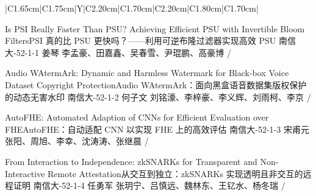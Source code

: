 \Needspace{7.5cm}
\begin{tabularx}{\textwidth}{|C{1.65cm}|C{1.75cm}|Y|C{2.20cm}|C{1.70cm}|C{2.20cm}|C{1.80cm}|C{1.70cm}|}
\HeaderRow

{Is PSI Really Faster Than PSU? Achieving Efficient PSU with Invertible Bloom Filters\newline PSI 真的比 PSU 更快吗？——利用可逆布隆过滤器实现高效 PSU}
{南信大-52-1-1}
{姜琴}
{李孟豪、田嘉鑫、吴春雪、尹琨鹏、高豪博}
{}{/}

{Audio WAtermArk: Dynamic and Harmless Watermark for Black-box Voice Dataset Copyright Protection\newline Audio WAtermArk：面向黑盒语音数据集版权保护的动态无害水印}
{南信大-52-1-2}
{何子文}
{刘铭濠、李梓豪、李义辉、刘雨柯、李京}
{}{/}


{AutoFHE: Automated Adaption of CNNs for Efficient Evaluation over FHE\newline AutoFHE：自动适配 CNN 以实现 FHE 上的高效评估}
{南信大-52-1-3}
{宋甫元}
{张阳、周旭、李幸、沈涛涛、张继晨}
{}{/}

{From Interaction to Independence: zkSNARKs for Transparent and Non-Interactive Remote Attestation\newline 从交互到独立：zkSNARKs 实现透明且非交互的远程证明}
{南信大-52-1-4}
{任勇军}
{张玥宁、吕慎远、魏林东、王钇水、杨冬瑞}
{}{/}
\end{tabularx}
\BlockGap





